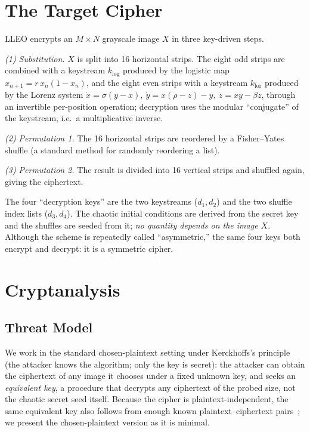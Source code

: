 \documentclass[conference,a4paper]{IEEEtran}
\begin{document}
\section{The Target Cipher}\label{sec:target}
LLEO encrypts an $M\times N$ grayscale image $X$ in three key-driven steps.

\emph{(1) Substitution.} $X$ is split into 16 horizontal strips. The eight odd strips are combined
with a keystream $k_{\mathrm{log}}$ produced by the logistic map $x_{n+1}=r\,x_n(1-x_n)$, and the
eight even strips with a keystream $k_{\mathrm{lor}}$ produced by the Lorenz system
$\dot x=\sigma(y-x),\ \dot y=x(\rho-z)-y,\ \dot z=xy-\beta z$, through an invertible per-position
operation; decryption uses the modular ``conjugate'' of the keystream, i.e.\ a multiplicative inverse.

\emph{(2) Permutation 1.} The 16 horizontal strips are reordered by a Fisher--Yates shuffle (a
standard method for randomly reordering a list).

\emph{(3) Permutation 2.} The result is divided into 16 vertical strips and shuffled again, giving the
ciphertext.

The four ``decryption keys'' are the two keystreams ($d_1,d_2$) and the two shuffle index lists
($d_3,d_4$). The chaotic initial conditions are derived from the secret key and the shuffles are
seeded from it; \emph{no quantity depends on the image $X$}. Although the scheme is repeatedly called
``asymmetric,'' the same four keys both encrypt and decrypt: it is a symmetric cipher.

\section{Cryptanalysis}\label{sec:crypt}
\subsection{Threat Model}
We work in the standard chosen-plaintext setting under Kerckhoffs's principle (the attacker knows the
algorithm; only the key is secret): the attacker can obtain the ciphertext of any image it chooses under
a fixed unknown key, and seeks an \emph{equivalent key}, a procedure that decrypts any ciphertext of
the probed size, not the chaotic secret seed itself.
Because the cipher is plaintext-independent, the same equivalent key also follows from enough known
plaintext--ciphertext pairs~\cite{zhang2018improved}; we present the chosen-plaintext version as it is
minimal.
\end{document}
